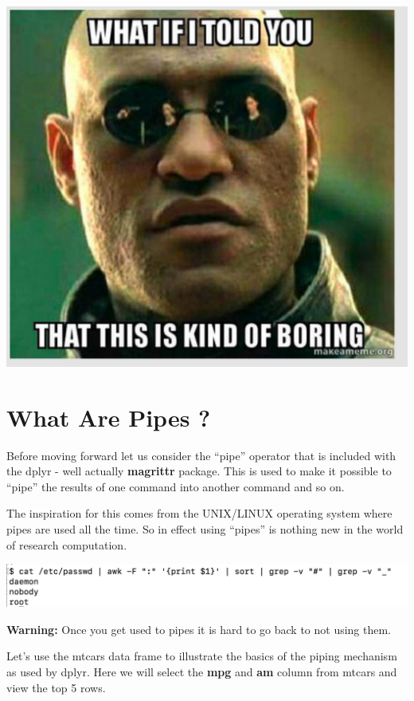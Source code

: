 \documentclass[]{book}
\begin{document}
\includegraphics[width=6.25in,height=\textheight]{./figures/morpheus.png}

\hypertarget{what-are-pipes}{%
\section{What Are Pipes ?}\label{what-are-pipes}}

Before moving forward let us consider the ``pipe'' operator that is included with the dplyr - well actually \textbf{magrittr} package. This is used to make it possible to ``pipe'' the results of one command into another command and so on.

The inspiration for this comes from the UNIX/LINUX operating system where pipes are used all the time. So in effect using ``pipes'' is nothing new in the world of research computation.

\includegraphics{./figures/unix_pipe.png}

\textbf{Warning:} Once you get used to pipes it is hard to go back to not using them.

Let's use the mtcars data frame to illustrate the basics of the piping mechanism as used by dplyr. Here we will select the \textbf{mpg} and \textbf{am} column from mtcars and view the top 5 rows.
\end{document}
